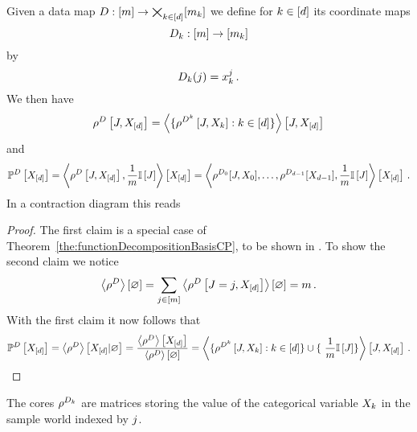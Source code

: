 \begin{theorem}\label{the:empCPRep}
	Given a data map $D: [m] \rightarrow \bigtimes_{k\in[d]}[m_{k}]$ we define for $k\in[d]$ its coordinate maps
		\[ D_{k} : [m] \rightarrow [m_{k}] \]
	by
		\[  D_{k}(j) = x_{k}^j \, .  \]
	We then have
	\begin{align*}
		\rho^{D}\left[J,X_{[d]}\right]  
		= \left\langle 
		\{\rho^{D^{k}}\left[J,X_{k}\right] : k\in[d] \} 
		\right\rangle \left[ J,X_{[d]} \right] 
	\end{align*}
	and
	\begin{align*}
	\mathbb{P}^{D}\left[X_{[d]}\right]
	= \left\langle \rho^{D}\left[J,X_{[d]}\right], \frac{1}{m}\mathbb{I}\left[J\right]\right\rangle \left[ X_{[d]} \right] 
	= \left\langle \rho^{D_{0}}[J,X_{0}],\ldots,\rho^{D_{d-1}}[X_{d-1}], \frac{1}{m}\mathbb{I}\left[J\right]\right\rangle \left[ X_{[d]} \right] \, . 
	\end{align*}
	In a contraction diagram this reads
	\begin{center}
		
	\end{center}
\end{theorem}
\begin{proof}
	The first claim is a special case of Theorem~\ref{the:functionDecompositionBasisCP}, to be shown in .
	To show the second claim we notice
		\[ \left\langle \rho^{D}\right\rangle \left[ \varnothing \right] = \sum_{j\in[m]} \left\langle \rho^{D}\left[J=j,X_{[d]}\right]\right\rangle \left[ \varnothing \right] = m \,  . \]
	With the first claim it now follows that
	\begin{align*}
		\empdistributionat{\shortcatvariables}
		 = \sbnormationof{\datacore}{\shortcatvariables}
		 = \frac{\sbcontractionof{\datacore}{\shortcatvariables}}{\sbcontraction{\datacore}} 
		 =  \contractionof{
		\{\rencodingofat{\datamap^{\atomenumerator}}{\datvariable,\catvariableof{\atomenumerator}} : \atomenumeratorin \} \cup \{ \frac{1}{\datanum} \onesat{\datvariable} \}
		}{\datvariable,\shortcatvariables}  \, . 
	\end{align*}
\end{proof}


The cores $\rho^{D_{k}}$ are matrices storing the value of the categorical variable $X_{k}$ in the sample world indexed by $j$.

